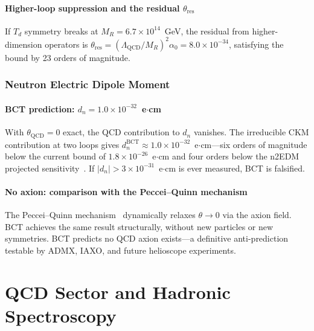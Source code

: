 \documentclass[review,number,sort&compress]{elsarticle}
\newcommand{\azero}{\alpha_0}
\newcommand{\LQCD}{\Lambda_{\mathrm{QCD}}}
\newcommand{\MR}{M_R}
\newcommand{\Td}{T_d}
\begin{document}
\subsection{Higher-loop suppression and the residual $\theta_{\mathrm{res}}$}

If $\Td$ symmetry breaks at $\MR = 6.7 \times 10^{14}$~GeV, the
residual from higher-dimension operators is
$\theta_{\mathrm{res}} = (\LQCD/\MR)^2 \azero = 8.0 \times 10^{-34}$,
satisfying the bound by 23 orders of magnitude.

\section{Neutron Electric Dipole Moment}
\label{sec:nEDM}

\subsection{BCT prediction: $d_n = 1.0 \times 10^{-32}$~e$\cdot$cm}

With $\theta_{\mathrm{QCD}} = 0$ exact, the QCD contribution to $d_n$
vanishes. The irreducible CKM contribution at two loops gives
$d_n^{\mathrm{BCT}} \approx 1.0 \times 10^{-32}$~e$\cdot$cm---six orders
of magnitude below the current bound of $1.8 \times 10^{-26}$~e$\cdot$cm
and four orders below the n2EDM projected sensitivity~\cite{n2EDM}.
If $|d_n| > 3 \times 10^{-31}$~e$\cdot$cm is ever measured, BCT is falsified.

\subsection{No axion: comparison with the Peccei--Quinn mechanism}

The Peccei--Quinn mechanism~\cite{PQ1977} dynamically relaxes $\theta \to 0$
via the axion field. BCT achieves the same result structurally, without
new particles or new symmetries. BCT predicts no QCD axion exists---a
definitive anti-prediction testable by ADMX, IAXO, and future
helioscope experiments.



\part{QCD Sector and Hadronic Spectroscopy}
\label{part:hadrons}
\end{document}
